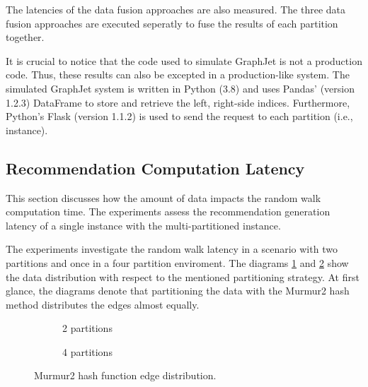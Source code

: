The latencies of the data fusion approaches are also measured. The three data fusion approaches are executed seperatly to fuse the results of each partition together.


It is crucial to notice that the code used to simulate GraphJet is not a production code. Thus, these results can also be excepted in a production-like system. The simulated GraphJet system is written in Python (3.8) and uses Pandas' (version 1.2.3) DataFrame to store and retrieve the left, right-side indices. Furthermore, Python's Flask (version 1.1.2) is used to send the request to each partition (i.e., instance).


\subsection{Recommendation Computation Latency}
\label{subsec:recommendation-computation-latency}
This section discusses how the amount of data impacts the random walk computation time. The experiments assess the recommendation generation latency of a single instance with the multi-partitioned instance.


The experiments investigate the random walk latency in a scenario with two partitions and once in a four partition enviroment. The diagrams \ref{plot:edge-distribution-2-partitions-murmur2} and \ref{plot:edge-distribution-4-partitions-murmur2} show the data distribution with respect to the mentioned partitioning strategy. At first glance, the diagrams denote that partitioning the data with the Murmur2 hash method distributes the edges almost equally. 

\begin{figure}[!htb]
    \centering
    \begin{subfigure}{\textwidth}
        \centering
        
        \caption{2 partitions}
        \label{plot:edge-distribution-2-partitions-murmur2}
    \end{subfigure}\qquad

    \begin{subfigure}{\textwidth}
        \centering
        
        \caption{4 partitions}
        \label{plot:edge-distribution-4-partitions-murmur2}
    \end{subfigure}\qquad
    \caption{Murmur2 hash function edge distribution.}
    \label{plot:edge-distirbution-murmur2}
\end{figure}


